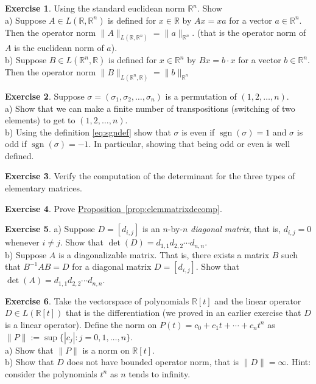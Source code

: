 \documentclass[12pt]{book}
\newcommand{\snorm}[1]{\lVert {#1} \rVert}
\newcommand{\abs}[1]{\left\lvert {#1} \right\rvert}
\newcommand{\R}{{\mathbb{R}}}
\newcommand{\myindex}[1]{#1\index{#1}}
\theoremstyle{plain}
\theoremstyle{remark}
\theoremstyle{definition}
\theoremstyle{exercise}
\newtheorem{exercise}{Exercise}[section]
\theoremstyle{example}
\newcommand{\propref}[1]{\hyperref[#1]{Proposition~\ref*{#1}}}
\begin{document}
\begin{exercise} \label{exercise:normonedim}
Using the standard euclidean norm $\R^n$. Show
\\
a) Suppose $A \in L(\R,\R^n)$ is defined for $x \in \R$ by $Ax = xa$
for a vector $a \in \R^n$.
Then the operator norm $\snorm{A}_{L(\R,\R^n)} = \snorm{a}_{\R^n}$.
(that is the operator norm of $A$ is the euclidean norm of $a$).
\\
b) Suppose $B \in L(\R^n,\R)$ is defined for $x \in \R^n$ by $Bx = b \cdot x$
for a vector $b \in \R^n$.
Then the operator norm $\snorm{B}_{L(\R^n,\R)} = \snorm{b}_{\R^n}$
\end{exercise}

\begin{exercise}
Suppose $\sigma = (\sigma_1,\sigma_2,\ldots,\sigma_n)$ is a permutation of
$(1,2,\ldots,n)$.\\
a) Show that we can make a finite number of transpositions (switching of two
elements) to get to $(1,2,\ldots,n)$.\\
b) Using the definition \eqref{eq:sgndef}
show that $\sigma$ is even if $\operatorname{sgn}(\sigma) = 1$ and $\sigma$
is odd if $\operatorname{sgn}(\sigma) = -1$.  In particular, showing that
being odd or even is well defined.
\end{exercise}

\begin{exercise}
Verify the computation of the determinant for the three types of 
elementary matrices.
\end{exercise}

\begin{exercise}
Prove \propref{prop:elemmatrixdecomp}.
\end{exercise}

\begin{exercise}
a) Suppose $D = [d_{i,j}]$ is an $n$-by-$n$ \emph{\myindex{diagonal matrix}}, that is, $d_{i,j} = 0$ whenever $i
\not= j$.  Show that $\det(D) = d_{1,1}d_{2,2} \cdots d_{n,n}$.
\\
b) Suppose $A$ is a diagonalizable matrix.  That is, there exists a matrix
$B$ such that $B^{-1}AB = D$ for a diagonal matrix $D = [d_{i,j}]$.  Show
that $\det(A) = d_{1,1}d_{2,2} \cdots d_{n,n}$.
\end{exercise}

\begin{exercise}
Take the vectorspace of polynomials $\R[t]$ and the linear operator $D \in
L(\R[t])$ that is
the differentiation (we proved in an earlier exercise that $D$ is a linear
operator).  Define the norm on $P(t) = c_0 + c_1 t + \cdots + c_n
t^n$ as $\snorm{P} := \sup \{ \abs{c_j} : j = 0,1,\ldots,n \}$.\\
a) Show that $\snorm{P}$ is a norm on $\R[t]$.\\
b) Show that $D$ does not have bounded operator norm, that is $\snorm{D} =
\infty$.  Hint: consider the polynomials $t^n$ as $n$ tends to infinity.
\end{exercise}
\end{document}
